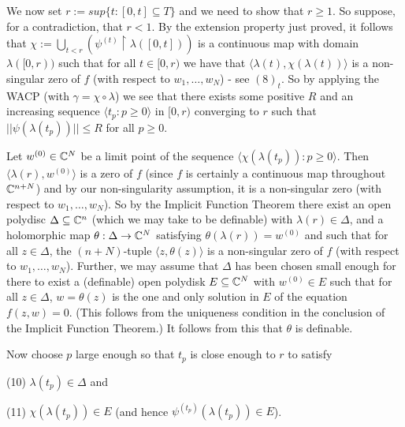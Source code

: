 \documentclass[12pt,nodate]{article}
\begin{document}
 We now set $r := sup \{ t : [0, t] \subseteq T \}$ and we need to show that $r \geq 1$. So suppose, for a contradiction, that $r < 1$. By the extension property just proved, it follows that $\chi := \bigcup_{t < r} (\psi^{(t)} \upharpoonright \lambda ([0, t]))$ is a continuous map with domain $\lambda ([0, r))$ such that for all $t \in [0, r)$ we have that $\langle \lambda (t), \chi (\lambda (t)) \rangle$ is a non-singular zero of $f$ (with respect to $w_1 , \ldots , w_N$) - see $(8)_t$. So by applying the WACP (with $\gamma = \chi \circ \lambda$) we see that there exists some positive $R$ and an increasing sequence $\langle t_p : p \geq 0 \rangle$ in $[0, r)$ converging to $r$ such that $|| \psi ( \lambda (t_p ))|| \leq R$ for all $p \geq 0$.
 
 Let $w^{(0)} \in \mathbb{C}^N$ be a limit point of the sequence $\langle \chi ( \lambda (t_p )) : p \geq 0 \rangle$. Then $ \langle \lambda (r) , w^{(0)} \rangle$ is a zero of $f$ (since $f$ is certainly a continuous map throughout $\mathbb{C}^{n+N}$) and by our non-singularity assumption, it is a non-singular zero (with respect to $w_1 , \ldots , w_N$). So by the Implicit Function Theorem there exist an open polydisc $\Delta \subseteq \mathbb{C}^{n}$ (which we may take to be definable) with $\lambda (r) \in \Delta$, and a holomorphic map $\theta : \Delta \rightarrow \mathbb{C}^N$ satisfying $\theta (\lambda (r)) = w^{(0)}$ and such that for all $z \in \Delta$, the $(n+N)$-tuple $\langle z, \theta (z) \rangle$ is a non-singular zero of $f$ (with respect to $w_1 , \ldots , w_N$). Further, we may assume that $\Delta$ has been chosen small enough for there to exist a (definable) open polydisk $E \subseteq \mathbb{C}^N$ with $w^{(0)} \in E$ such that for all $z \in \Delta$, $w = \theta (z)$ is the one and only solution in $E$ of the equation $f(z, w) = 0$. (This follows from the uniqueness condition in the conclusion of the Implicit Function Theorem.) It follows from this that $\theta$ is definable.
 
 \vspace{1mm}
 
 Now choose $p$ large enough so that $t_p$ is close enough to $r$ to satisfy 
 
 \vspace{3mm}
 
 \noindent
 (10) \hspace{2mm} $\lambda (t_p ) \in \Delta$ and
 
 \vspace{3mm}
 
 \noindent
 (11) \hspace{2mm} $\chi (\lambda (t_p )) \in E$ (and hence $\psi^{(t_p )} (\lambda (t_p )) \in E$).
 
\end{document}
